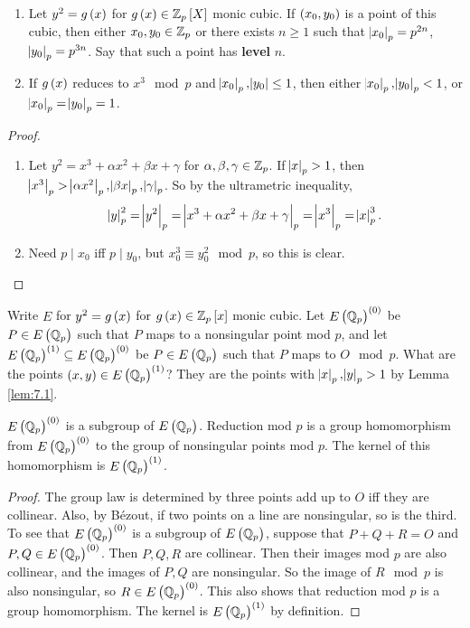 \begin{lemma}
\label{lem:7.1}
\hfill
\begin{enumerate}
\item Let $ y^2 = g\br{x} $ for $ g\br{x} \in \Z_p\sbr{X} $ monic cubic. If $ \br{x_0, y_0} $ is a point of this cubic, then either $ x_0, y_0 \in \mathbb{Z}_p $ or there exists $ n \ge 1 $ such that $ \abs{x_0}_p = p^{2n} $, $ \abs{y_0}_p = p^{3n} $. Say that such a point has \textbf{level} $ n $.
\item If $ g\br{x} $ reduces to $ x^3 \mod p $ and $ \abs{x_0}_p, \abs{y_0} \le 1 $, then either $ \abs{x_0}_p, \abs{y_0}_p < 1 $, or $ \abs{x_0}_p = \abs{y_0}_p = 1 $.
\end{enumerate}
\end{lemma}

\begin{proof}
\hfill
\begin{enumerate}
\item Let $ y^2 = x^3 + \alpha x^2 + \beta x + \gamma $ for $ \alpha, \beta, \gamma \in \mathbb{Z}_p $. If $ \abs{x}_p > 1 $, then $ \abs{x^3}_p > \abs{\alpha x^2}_p, \abs{\beta x}_p, \abs{\gamma}_p $. So by the ultrametric inequality,
$$ \abs{y}_p^2 = \abs{y^2}_p = \abs{x^3 + \alpha x^2 + \beta x + \gamma}_p = \abs{x^3}_p = \abs{x}_p^3. $$
\item Need $ p \mid x_0 $ iff $ p \mid y_0 $, but $ x_0^3 \equiv y_0^2 \mod p $, so this is clear.
\end{enumerate}
\end{proof}

Write $ E $ for $ y^2 = g\br{x} $ for $ g\br{x} \in \Z_p\sbr{x} $ monic cubic. Let $ E\br{\Q_p}^{\br{0}} $ be $ P \in E\br{\Q_p} $ such that $ P $ maps to a nonsingular point mod $ p $, and let $ E\br{\Q_p}^{\br{1}} \subseteq E\br{\Q_p}^{\br{0}} $ be $ P \in E\br{\Q_p} $ such that $ P $ maps to $ O \mod p $. What are the points $ \br{x, y} \in E\br{\Q_p}^{\br{1}} $? They are the points with $ \abs{x}_p, \abs{y}_p > 1 $ by Lemma \ref{lem:7.1}.

\begin{lemma}
\label{lem:7.2}
$ E\br{\Q_p}^{\br{0}} $ is a subgroup of $ E\br{\Q_p} $. Reduction mod $ p $ is a group homomorphism from $ E\br{\Q_p}^{\br{0}} $ to the group of nonsingular points mod $ p $. The kernel of this homomorphism is $ E\br{\Q_p}^{\br{1}} $.
\end{lemma}

\begin{proof}
The group law is determined by three points add up to $ O $ iff they are collinear. Also, by Bézout, if two points on a line are nonsingular, so is the third. To see that $ E\br{\Q_p}^{\br{0}} $ is a subgroup of $ E\br{\Q_p} $, suppose that $ P + Q + R = O $ and $ P, Q \in E\br{\Q_p}^{\br{0}} $. Then $ P, Q, R $ are collinear. Then their images mod $ p $ are also collinear, and the images of $ P, Q $ are nonsingular. So the image of $ R \mod p $ is also nonsingular, so $ R \in E\br{\Q_p}^{\br{0}} $. This also shows that reduction mod $ p $ is a group homomorphism. The kernel is $ E\br{\Q_p}^{\br{1}} $ by definition.
\end{proof}

